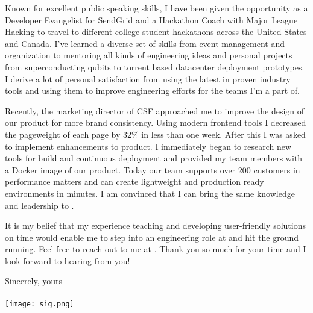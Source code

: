 \documentclass[12pt,a4paper,sans]{moderncv}
\begin{document}
\tab Known for excellent public speaking skills, I have been given the opportunity as a Developer Evangelist for SendGrid and a Hackathon Coach with Major League Hacking to travel to different college student hackathons across the United States and Canada. I’ve learned a diverse set of skills from event management and organization to mentoring all kinds of engineering ideas and personal projects from superconducting qubits to torrent based datacenter deployment prototypes. I derive a lot of personal satisfaction from using the latest in proven industry tools and using them to improve engineering efforts for the teams I'm a part of. 

\tab Recently, the marketing director of CSF approached me to improve the design of our product for more brand consistency. Using modern frontend tools I decreased the pageweight of each page by 32\% in less than one week. After this I was asked to implement enhancements to product. I immediately began to research new tools for build and continuous deployment and provided my team members with a Docker image of our product. Today our team supports over 200 customers in performance matters and can create lightweight and production ready environments in minutes. I am convinced that I can bring the same knowledge and leadership to \company. 




\tab It is my belief that my experience teaching and developing user-friendly solutions on time would enable me to step into an engineering role at \company{} and hit the ground running.
Feel free to reach out to me at \cellphone. Thank you so much for your time and I look forward to hearing from you!

\begin{flushleft}
Sincerely, yours \\
	\textbf{\fullname}
\\
\texttt{[image: sig.png]}
\end{flushleft}


\nocite{*}

         
\end{document}
